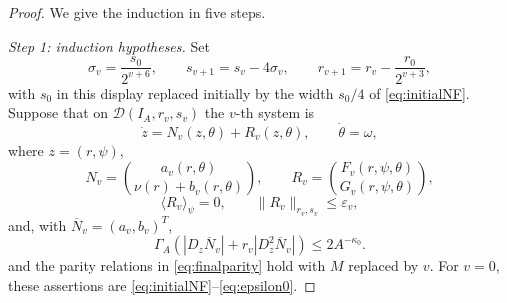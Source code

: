 \documentclass[10pt,a4paper]{amsart}
\newcommand{\av}[1]{\langle #1\rangle}
\newcommand{\cD}{\mathcal D}
\newcommand{\eps}{\varepsilon}
\newcommand{\norm}[1]{\lVert #1\rVert}
\begin{document}
\begin{proof}
We give the induction in five steps.

\smallskip
\noindent\emph{Step 1: induction hypotheses.}
Set
\begin{equation}\label{eq:widths}
 \sigma_v=\frac{s_0}{2^{v+6}},\qquad
 s_{v+1}=s_v-4\sigma_v,\qquad
 r_{v+1}=r_v-\frac{r_0}{2^{v+3}},
\end{equation}
with $s_0$ in this display replaced initially by the width $s_0/4$
of \eqref{eq:initialNF}.  Suppose that on
$\cD(I_A,r_v,s_v)$ the $v$-th system is
\begin{equation}\label{eq:vthsystem}
 \dot z=N_v(z,\theta)+R_v(z,\theta),\qquad
 \dot\theta=\omega,
\end{equation}
where $z=(r,\psi)$,
\begin{equation}\label{eq:NvRv}
 N_v=
 \binom{a_v(r,\theta)}
       {\nu(r)+b_v(r,\theta)},\qquad
 R_v=\binom{F_v(r,\psi,\theta)}
           {G_v(r,\psi,\theta)},
\end{equation}
\[
 \av{R_v}_{\psi}=0,\qquad
 \norm{R_v}_{r_v,s_v}\leq\eps_v,
\]
and, with $\overline N_v=(a_v,b_v)^T$,
\begin{equation}\label{eq:averageTameV}
 \Gamma_A\left(
 |D_z\overline N_v|+
 r_v|D_z^2\overline N_v|
 \right)\leq2A^{-\kappa_0}.
\end{equation}
and the parity relations in \eqref{eq:finalparity} hold with $M$ replaced by
$v$.  For $v=0$, these assertions are \eqref{eq:initialNF}--\eqref{eq:epsilon0}.


\end{proof}
\end{document}

